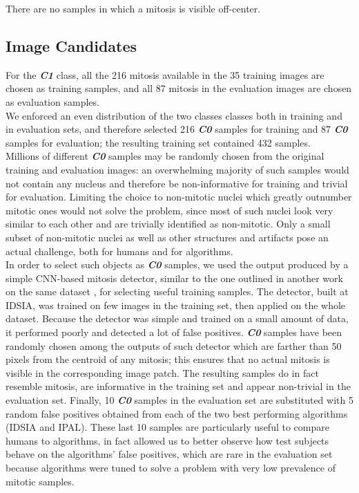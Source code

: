 \noindent There are no samples in which a mitosis is visible off-center.

\vspace{0.5cm}

\subsection{Image Candidates}
\label{ch4:ic}

For the \textit{\textbf{C1}} class, all the 216 mitosis available in the 35 training images are chosen
as training samples, and all 87 mitosis in the evaluation images are chosen as
evaluation samples.\\
We enforced an even distribution of the two classes classes both in training and in evaluation sets, and therefore
selected 216 \textit{\textbf{C0}} samples for training and 87 \textit{\textbf{C0}} samples for evaluation; the resulting
training set contained 432 samples.\\
Millions of different \textit{\textbf{C0}} samples may be randomly chosen from the original training and evaluation images:
an overwhelming majority of such samples would not contain any nucleus and therefore be non-informative for training and trivial for
evaluation. Limiting the choice to non-mitotic nuclei \texttwelveudash{} which greatly outnumber
mitotic ones \texttwelveudash{} would not solve the problem, since most of such nuclei look very
similar to each other and are trivially identified as non-mitotic. Only a small
subset of non-mitotic nuclei \texttwelveudash{} as well as other structures and artifacts \texttwelveudash{} pose an
actual challenge, both for humans and for algorithms.\\
In order to select such objects as \textit{\textbf{C0}} samples, we used the output produced by a simple \Gls{CNN}-based mitosis detector,
similar to the one outlined in another work on the same dataset \cite{agNN}, for selecting useful training samples.
The detector, built at IDSIA, was trained on few images in the training set, then applied on the whole dataset.
Because the detector was simple and trained on a small amount of data, it performed poorly and detected a lot of false positives.
\textit{\textbf{C0}} samples have been randomly chosen among the outputs of such detector which are
farther than 50 pixels from the centroid of any mitosis; this ensures that no actual
mitosis is visible in the corresponding image patch. The resulting samples do in
fact resemble mitosis, are informative in the training set and appear non-trivial
in the evaluation set. Finally, 10 \textit{\textbf{C0}} samples in the evaluation set are substituted
with 5 random false positives obtained from each of the two best performing
algorithms (IDSIA and IPAL). These last 10 samples are particularly useful to compare humans to algorithms, in fact allowed us to better observe how test subjects
behave on the algorithms’ false positives, which are rare in the evaluation set because
algorithms were tuned to solve a problem with very low prevalence of mitotic samples.


